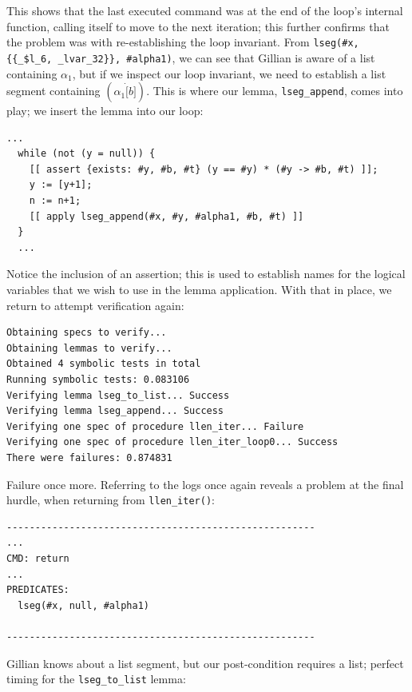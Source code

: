 This shows that the last executed command was at the end of the loop's internal
function, calling itself to move to the next iteration; this further confirms
that the problem was with re-establishing the loop invariant. From
\texttt{lseg(\#x, \{\{\_\$l\_6, \_lvar\_32\}\}, \#alpha1)}, we can see that Gillian
is aware of a list containing $\alpha_1$, but if we inspect our loop invariant,
we need to establish a list segment containing $(\alpha_1 \dot [b])$. This is
where our lemma, \texttt{lseg\_append}, comes into play; we insert the lemma
into our loop:
\begin{lstlisting}[style=code, numbers=none, caption={Applying \texttt{lseg\_append}}]
  ...
  while (not (y = null)) {
    [[ assert {exists: #y, #b, #t} (y == #y) * (#y -> #b, #t) ]];
    y := [y+1];
    n := n+1;
    [[ apply lseg_append(#x, #y, #alpha1, #b, #t) ]]
  }
  ...
\end{lstlisting}

Notice the inclusion of an assertion; this is used to establish names for the
logical variables that we wish to use in the lemma application. With that in
place, we return to attempt verification again:

\begin{lstlisting}[style=code, numbers=none, caption={WISL list length - list / list segment error}]
Obtaining specs to verify...
Obtaining lemmas to verify...
Obtained 4 symbolic tests in total
Running symbolic tests: 0.083106
Verifying lemma lseg_to_list... Success
Verifying lemma lseg_append... Success
Verifying one spec of procedure llen_iter... Failure
Verifying one spec of procedure llen_iter_loop0... Success
There were failures: 0.874831
\end{lstlisting}

Failure once more. Referring to the logs once again reveals a problem at the
final hurdle, when returning from \texttt{llen\_iter()}:

\begin{lstlisting}[numbers=none, style=code, caption={WISL list length - list / list segment error, Gillian log file}]
------------------------------------------------------
...
CMD: return
...
PREDICATES:
  lseg(#x, null, #alpha1)

------------------------------------------------------
\end{lstlisting}

Gillian knows about a list segment, but our post-condition requires a list;
perfect timing for the \texttt{lseg\_to\_list} lemma:

